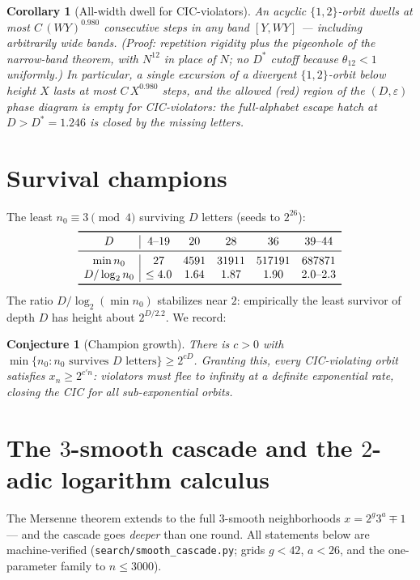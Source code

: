 \documentclass[11pt]{article}
\newtheorem{corollary}{Corollary}
\newtheorem{conjecture}{Conjecture}
\begin{document}
\begin{corollary}[All-width dwell for CIC-violators]\label{cor:dwell}
An acyclic $\{1,2\}$-orbit dwells at most
$C\,(WY)^{0.980}$ consecutive steps in \emph{any} band $[Y,WY]$ ---
including arbitrarily wide bands. (Proof: repetition rigidity plus the
pigeonhole of the narrow-band theorem, with $N^{12}$ in place of $N$;
no $D^*$ cutoff because $\theta_{12}<1$ uniformly.) In particular, a
single excursion of a divergent $\{1,2\}$-orbit below height $X$ lasts
at most $C\,X^{0.980}$ steps, and the allowed (red) region of the
$(D,\varepsilon)$ phase diagram is \emph{empty} for CIC-violators: the
full-alphabet escape hatch at $D>D^*=1.246$ is closed by the missing
letters.
\end{corollary}

\section{Survival champions}

The least $n_0\equiv3\pmod4$ surviving $D$ letters (seeds to
$2^{26}$):
\[
\begin{array}{c|ccccccc}
\toprule
D & 4\text{--}19 & 20 & 28 & 36 & 39\text{--}44\\
\midrule
\min n_0 & 27 & 4591 & 31911 & 517191 & 687871\\
D/\log_2 n_0 & \le4.0 & 1.64 & 1.87 & 1.90 & 2.0\text{--}2.3\\
\bottomrule
\end{array}
\]
The ratio $D/\log_2(\min n_0)$ stabilizes near $2$: empirically the
least survivor of depth $D$ has height about $2^{D/2.2}$. We record:

\begin{conjecture}[Champion growth]\label{conj:champ}
There is $c>0$ with $\min\{n_0:\text{$n_0$ survives $D$ letters}\}\ge
2^{cD}$. Granting this, every CIC-violating orbit satisfies
$x_n\ge2^{c'n}$: violators must flee to infinity at a definite
exponential rate, closing the CIC for all sub-exponential orbits.
\end{conjecture}

\section{The $3$-smooth cascade and the $2$-adic logarithm calculus}

The Mersenne theorem extends to the full $3$-smooth neighborhoods
$x=2^g3^a\mp1$ --- and the cascade goes \emph{deeper} than one round.
All statements below are machine-verified
(\texttt{search/smooth\_cascade.py}; grids $g<42$, $a<26$, and the
one-parameter family to $n\le3000$).
\end{document}
